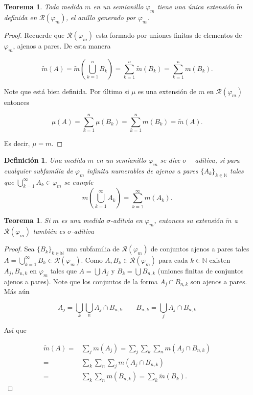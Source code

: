 \documentclass[twoside,12pt,a4 paper,openright]{book}
\newtheorem{teo}[claim]{Teorema}
\newtheorem{defi}[claim]{Definici\'on}
\begin{document}
\begin{teo}
    Toda medida $m$ en un semianillo $\varphi_m$ tiene una \'unica extensi\'on $\tilde{m}$ definida en $\mathcal{R}(\varphi_m)$, el  anillo generado por $\varphi_m$.
\end{teo}
\begin{proof}
    Recuerde que $\mathcal{R}(\varphi_m )$ esta formado por uniones finitas de elementos de $\varphi_m$, ajenos a pares. De esta manera 

    $$\tilde{m}(A) = \tilde{m}\left(\bigcup_{k=1}^{n}B_k\right) = \sum_{k=1}^{n}\tilde{m}(B_k) = \sum_{k=1}^{n}m(B_k).$$

    Note que est\'a bien definida.  Por \'ultimo si $\mu $ es una extensi\'on de $m$ en $\mathcal{R}(\varphi_m)$ entonces 

    $$\mu (A) = \sum_{k = 1}^n \mu (B_k) = \sum_{k = 1}^n m(B_k) = \tilde{m}(A).$$

    Es decir, $\mu  = m$.
\end{proof}

\begin{defi}
    Una medida $m$ en un semianillo $\varphi_m$ se dice $\sigma-$aditiva, si para cualquier subfamilia de $\varphi_m$ infinita numerables de ajenos a pares $\{A_k\}_{k\in \mathbb{N}}$ tales que $\bigcup_{k=1}^{\infty} A_k \in \varphi_m$ se cumple
    $$m\left(\bigcup_{k=1}^{\infty} A_k\right) = \sum_{k=1}^\infty m(A_k).$$
\end{defi}
\begin{teo}
    Si $m$ es una medida $\sigma$-aditvia en $\varphi_m$, entonces su extensi\'on $\tilde{m}$ a $\mathcal{R}(\varphi_m)$ tambi\'en es $\sigma$-aditiva
\end{teo}
\begin{proof}
      Sea $\{B_k\}_{k\in \mathbb{N}}$ una subfamilia de $\mathcal{R}(\varphi_m)$ de conjuntos ajenos a pares tales     $A = \bigcup_{k=1}^{\infty}B_k\in \mathcal{R}(\varphi_m)$. Como $A,B_k\in \mathcal{R}(\varphi_m)$ para cada $k\in \mathbb{N}$ existen $A_j,B_{n,k}$ en $\varphi_m$ tales que $A = \bigcup A_j$ y $B_{k} = \bigcup B_{n,k}$ (uniones finitas de conjuntos ajenos a pares). Note que los conjuntos de la forma $A_j \cap B_{n,k}$ son ajenos a pares. M\'as a\'un 

      $$A_j = \bigcup_k \bigcup_n A_j \cap B_{n,k}\quad\quad B_{n,k} = \bigcup_j A_j \cap B_{n,k} $$

      As\'i que 

      \begin{align*}
           \tilde{m}(A) =& \sum_j m(A_j) = \sum_j \sum_k \sum_n m(A_j \cap B_{n,k}) \\
           = &\sum_k \sum_n \sum_j m(A_j \cap B_{n,k}) \\
           = & \sum_k\sum_n m(B_{n,k}) = \sum_k \tilde{m}(B_k).
      \end{align*}
    
\end{proof}
\end{document}
